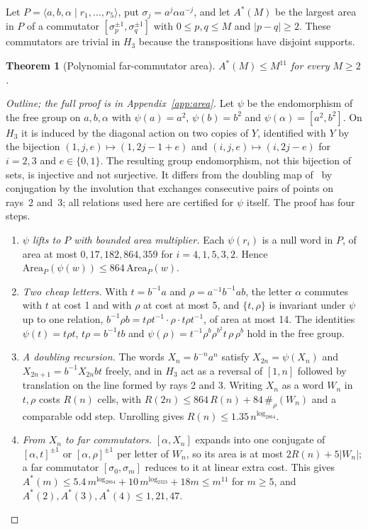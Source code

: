 \documentclass[11pt,a4paper]{article}
\theoremstyle{plain}
\newtheorem{theorem}{Theorem}[section]
\theoremstyle{definition}
\theoremstyle{remark}
\begin{document}
Let $P=\langle a,b,\alpha\mid r_1,\dots,r_5\rangle$, put $\sigma_j=a^j\alpha a^{-j}$, and let $A^*(M)$ be the
largest area in $P$ of a commutator $[\sigma_p^{\pm1},\sigma_q^{\pm1}]$ with $0\le p,q\le M$ and $|p-q|\ge2$. These
commutators are trivial in $H_3$ because the transpositions have disjoint supports.

\begin{theorem}[Polynomial far-commutator area]\label{thm:area}
$A^*(M)\le M^{11}$ for every $M\ge2$.
\end{theorem}

\begin{proof}[Outline; the full proof is in Appendix~\ref{app:area}]
Let $\psi$ be the endomorphism of the free group on $a,b,\alpha$ with $\psi(a)=a^2$, $\psi(b)=b^2$ and
$\psi(\alpha)=[a^2,b^2]$. On $H_3$ it is induced by the diagonal action on two copies of $Y$, identified with $Y$ by the bijection
$(1,j,e)\mapsto(1,2j-1+e)$ and $(i,j,e)\mapsto(i,2j-e)$ for $i=2,3$ and $e\in\{0,1\}$.
The resulting group endomorphism, not this bijection of sets, is injective and not surjective. It differs from the doubling map
of~\cite{BCMR2014} by conjugation by the involution that exchanges consecutive pairs of points on rays~2 and~3; all relations used here are
certified for $\psi$ itself. The proof has four steps.
\begin{enumerate}[label=(\arabic*)]
\item \emph{$\psi$ lifts to $P$ with bounded area multiplier.} Each $\psi(r_i)$ is a null word in $P$, of area at
most $0,17,182,864,359$ for $i=4,1,5,3,2$. Hence $\mathrm{Area}_P(\psi(w))\le864\,\mathrm{Area}_P(w)$.
\item \emph{Two cheap letters.} With $t=b^{-1}a$ and $\rho=a^{-1}b^{-1}ab$, the letter $\alpha$ commutes with $t$ at
cost 1 and with $\rho$ at cost at most 5, and $\{t,\rho\}$ is invariant under $\psi$ up to one relation,
$b^{-1}\rho b=t\rho t^{-1}\cdot\rho\cdot t\rho t^{-1}$, of area at most 14. The identities $\psi(t)=t\rho t$,
$t\rho=b^{-1}tb$ and $\psi(\rho)=t^{-1}\rho^b\rho^{b^2}t\,\rho\,\rho^b$ hold in the free group.
\item \emph{A doubling recursion.} The words $X_n=b^{-n}a^n$ satisfy $X_{2n}=\psi(X_n)$ and $X_{2n+1}=b^{-1}X_{2n}bt$
freely, and in $H_3$ act as a reversal of $[1,n]$ followed by translation on the line formed by rays 2 and 3. Writing
$X_n$ as a word $W_n$ in $t,\rho$ costs $R(n)$ cells, with $R(2n)\le864\,R(n)+84\,\#_\rho(W_n)$ and a comparable odd
step. Unrolling gives $R(n)\le1.35\,n^{\log_2864}$.
\item \emph{From $X_n$ to far commutators.} $[\alpha,X_n]$ expands into one conjugate of $[\alpha,t]^{\pm1}$ or
$[\alpha,\rho]^{\pm1}$ per letter of $W_n$, so its area is at most $2R(n)+5|W_n|$; a far commutator
$[\sigma_0,\sigma_m]$ reduces to it at linear extra cost. This gives $A^*(m)\le5.4\,m^{\log_2864}+10\,m^{\log_2323}+18m\le
m^{11}$ for $m\ge5$, and $A^*(2),A^*(3),A^*(4)\le1,21,47$.
\end{enumerate}
\end{proof}
\end{document}
